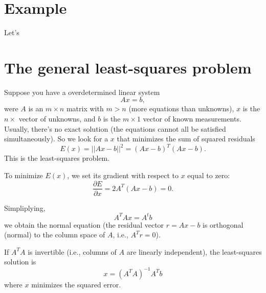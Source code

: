 \section*{Example}
Let's 


\section*{The general least-squares problem}
Suppose you have a overdetermined linear system
\begin{equation}
  Ax=b,
\end{equation}
were $A$ is an $m\times n$ matrix with $m>n$ (more equations than unknowns), $x$ is the $n\times $ vector of unknowns, and $b$ is the $m\times 1$ vector of known measurements. Usually, there's no exact solution (the equations cannot all be satisfied simultaneously). So we look for a $x$ that minimizes the sum of squared residuals
\begin{equation}
  E(x) = ||Ax-b||^2 = (Ax-b)^T(Ax-b).
\end{equation}
This is the least-squares problem.

To minimize $E(x)$, we set its gradient with respect to $x$ equal to zero:
\begin{equation}
  \frac{\partial E}{\partial x} = 2A^T(Ax-b) = 0.
\end{equation}

Simpliplying,
\begin{equation}
  A^TAx = A^tb
\end{equation}
we obtain the normal equation (the residual vector $r=Ax-b$ is orthogonal (normal) to the column space of $A$, i.e., $A^Tr=0$).

If $A^TA$ is invertible (i.e., columns of $A$ are linearly independent), the least-squares solution is
\begin{equation}
  x = (A^TA)^{-1}A^Tb
\end{equation}
where $x$ minimizes the squared error.

